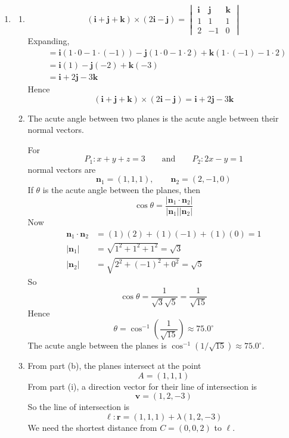 \documentclass[leqno]{article}
\begin{document}
\begin{enumerate}[
  label=\textbf{\arabic*.},
  leftmargin=*,
  topsep=0pt,
  partopsep=0pt,
  parsep=0pt
]
\begin{tcolorbox}[colback=white, colframe=scarlet, title={\textbf{Solution}}, breakable, grow to left by=6mm, grow to right by=10mm]
\begin{enumerate}[label=\textbf{(\alph*)}]
  \item \begin{enumerate}[label=(\roman*)]
    \item
\[
(\mathbf i+\mathbf j+\mathbf k)\times(2\mathbf i-\mathbf j)
=
\begin{vmatrix}
\mathbf i & \mathbf j & \mathbf k \\
1 & 1 & 1 \\
2 & -1 & 0
\end{vmatrix}
\]
Expanding,
\begin{align*}
&=\mathbf i(1\cdot 0-1\cdot(-1))
-\mathbf j(1\cdot 0-1\cdot 2)
+\mathbf k(1\cdot(-1)-1\cdot 2) \\
&=\mathbf i(1)-\mathbf j(-2)+\mathbf k(-3) \\
&=\mathbf i+2\mathbf j-3\mathbf k
\end{align*}
Hence
\[
(\mathbf i+\mathbf j+\mathbf k)\times(2\mathbf i-\mathbf j)=\mathbf i+2\mathbf j-3\mathbf k
\]

    \item The acute angle between two planes is the acute angle between their normal vectors.

For
\[
P_1:x+y+z=3 \qquad \text{and} \qquad P_2:2x-y=1
\]
normal vectors are
\[
\mathbf n_1=(1,1,1), \qquad \mathbf n_2=(2,-1,0)
\]
If $\theta$ is the acute angle between the planes, then
\[
\cos\theta=\frac{\left\lvert \mathbf n_1\cdot \mathbf n_2\right\rvert}{\left\lvert \mathbf n_1\right\rvert\left\lvert \mathbf n_2\right\rvert}
\]
Now
\begin{align*}
\mathbf n_1\cdot \mathbf n_2&=(1)(2)+(1)(-1)+(1)(0)=1 \\
\left\lvert \mathbf n_1\right\rvert&=\sqrt{1^2+1^2+1^2}=\sqrt{3} \\
\left\lvert \mathbf n_2\right\rvert&=\sqrt{2^2+(-1)^2+0^2}=\sqrt{5}
\end{align*}
So
\[
\cos\theta=\frac{1}{\sqrt{3}\sqrt{5}}=\frac{1}{\sqrt{15}}
\]
Hence
\[
\theta=\cos^{-1}\!\left(\frac{1}{\sqrt{15}}\right)\approx 75.0^\circ
\]
The acute angle between the planes is $\cos^{-1}(1/\sqrt{15})\approx 75.0^\circ$.

    \item From part (b), the planes intersect at the point
\[
A=(1,1,1)
\]
From part (i), a direction vector for their line of intersection is
\[
\mathbf v=(1,2,-3)
\]
So the line of intersection is
\[
\ell:\mathbf r=(1,1,1)+\lambda(1,2,-3)
\]
We need the shortest distance from $C=(0,0,2)$ to $\ell$.


\end{enumerate}
\end{enumerate}
\end{tcolorbox}
\end{enumerate}
\end{document}

